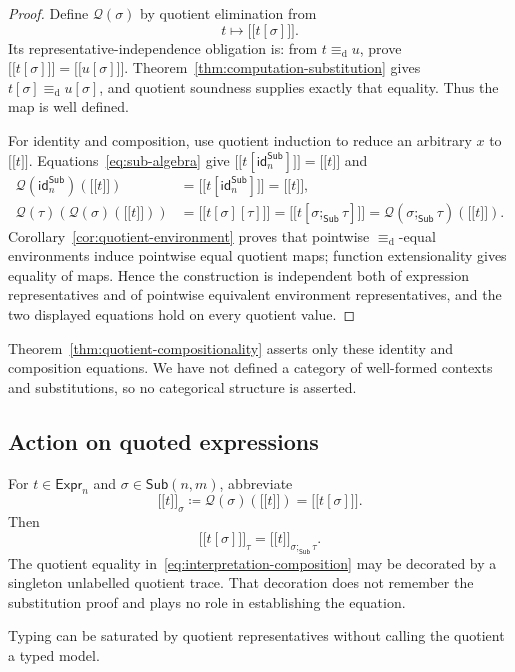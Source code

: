 \documentclass[10pt,reqno]{amsart}
\newcommand{\Expr}{\mathsf{Expr}}
\newcommand{\Sub}{\mathsf{Sub}}
\newcommand{\den}[1]{\mathopen{\lbrack\!\lbrack}#1\mathclose{\rbrack\!\rbrack}}
\newcommand{\defeq}{\mathrel{\equiv_{\mathrm d}}}
\newcommand{\idren}{\mathsf{id}}
\newcommand{\Q}{\mathcal{Q}}
\begin{document}
\begin{proof}
Define \(\Q(\sigma)\) by quotient elimination from
\[
 t\longmapsto\den{t[\sigma]}.
\]
Its representative-independence obligation is: from \(t\defeq u\), prove
\(\den{t[\sigma]}=\den{u[\sigma]}\).  Theorem~\ref{thm:computation-substitution}
gives \(t[\sigma]\defeq u[\sigma]\), and quotient soundness supplies exactly
that equality.  Thus the map is well defined.

For identity and composition, use quotient induction to reduce an arbitrary
\(x\) to \(\den t\).  Equations~\eqref{eq:sub-algebra} give
\(\den{t[\idren^{\Sub}_n]}=\den t\) and
\[
 \begin{aligned}
 \Q(\idren^{\Sub}_n)(\den t)
   &=\den{t[\idren^{\Sub}_n]}=\den t,\\
 \Q(\tau)(\Q(\sigma)(\den t))
   &=\den{t[\sigma][\tau]}
     =\den{t[\sigma;_{\Sub}\tau]}
     =\Q(\sigma;_{\Sub}\tau)(\den t).
 \end{aligned}
\]
Corollary~\ref{cor:quotient-environment} proves that pointwise
\(\defeq\)-equal environments induce pointwise equal quotient maps; function
extensionality gives equality of maps.  Hence the construction is independent
both of expression representatives and of pointwise equivalent environment
representatives, and the two displayed equations hold on every quotient
value.
\end{proof}

Theorem~\ref{thm:quotient-compositionality} asserts only these identity and
composition equations.  We have not defined a category of well-formed
contexts and substitutions, so no categorical structure is asserted.

\subsection{Action on quoted expressions}

For \(t\in\Expr_n\) and \(\sigma\in\Sub(n,m)\), abbreviate
\[
                       \den t_\sigma\coloneqq
                       \Q(\sigma)(\den t)=\den{t[\sigma]}.
\tag{7.4}\label{eq:environment-interpretation}
\]
Then
\[
          \den{t[\sigma]}_\tau
            =\den t_{\sigma;_{\Sub}\tau}.
\tag{7.5}\label{eq:interpretation-composition}
\]
The quotient equality in~\eqref{eq:interpretation-composition} may be
decorated by a singleton unlabelled quotient trace.  That decoration does
not remember the substitution proof and plays no role in establishing the
equation.

Typing can be saturated by quotient representatives without calling the
quotient a typed model.
\end{document}
